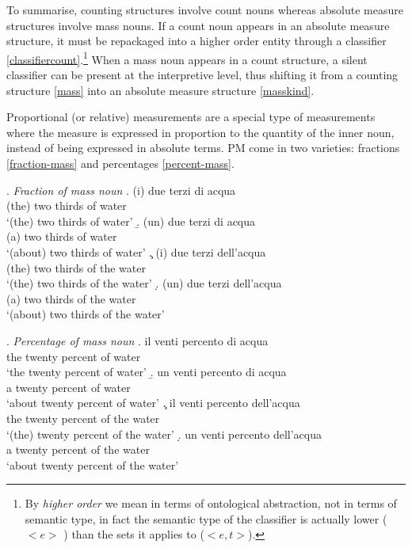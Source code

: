\documentclass[charis, linguex]{glossa}
\begin{document}
To summarise, counting structures involve count nouns whereas absolute measure structures involve mass nouns. If a count noun appears in an absolute measure structure, it must be repackaged into a higher order entity through a classifier \ref{classifiercount}.\footnote{By \textit{higher order} we mean in terms of ontological abstraction, not in terms of semantic type, in fact the semantic type of the classifier is actually lower ($<e>$ ) than the sets  it applies to ($<e,t>$).} When a mass noun appears in a count structure, a silent classifier can be present at the interpretive level, thus shifting it from a counting structure \ref{mass} into an absolute measure structure \ref{masskind}.

Proportional (or relative) measurements are a special type of measurements where the measure is expressed in proportion to the quantity of the inner noun, instead of being expressed in absolute terms. PM come in two varieties: fractions \ref{fraction-mass} and percentages  \ref{percent-mass}. 

\ex. \textit{Fraction of mass noun} \label{fraction-mass}
\a.  \gll (i) due terzi di acqua \\
          (the) two thirds of water \\
     \glt `(the) two thirds of water'  \label{fraction-mass-a}
\b.  \gll (un) due terzi di acqua \\
          (a) two thirds of water \\
 	 \glt  `(about) two thirds of water'  \label{fraction-mass-b}
\c. \gll (i) due terzi dell'acqua \\
         (the) two thirds {of the water} \\
    \glt `(the) two thirds of the water'  \label{fraction-mass-c}
\d. \gll (un) due terzi dell'acqua \\
        (a) two thirds {of the water} \\
 	 \glt  `(about) two thirds of the water'  \label{fraction-mass-d}
	 
	   
\ex. \textit{Percentage of mass noun} \label{percent-mass}
\a. \gll il venti percento di acqua \\
         the  twenty percent of water \\
    \glt `the  twenty percent of water'  \label{percent-mass-a}
\b. \gll un venti percento di acqua \\
        a  twenty percent of water \\
    \glt `about twenty percent of water'  \label{percent-mass-b}
\c. \gll il venti percento dell'acqua \\
         the twenty percent {of the water} \\
    \glt `(the) twenty percent of the water'  \label{percent-mass-c}		  
\d. \gll un venti percento  dell'acqua \\
	     a  twenty percent {of the water} \\
    \glt `about  twenty percent of the water'  \label{percent-mass-d}
	  
\end{document}
